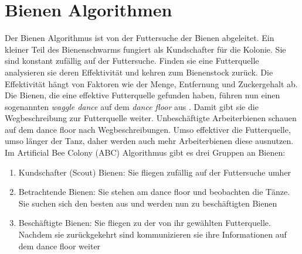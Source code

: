 \section{Bienen Algorithmen}
Der Bienen Algorithmus ist von der Futtersuche der Bienen abgeleitet. Ein kleiner Teil des Bienenschwarms fungiert als Kundschafter für die Kolonie.
Sie sind konstant zufällig auf der Futtersuche. Finden sie eine Futterquelle analysieren sie deren Effektivität und kehren zum Bienenstock zurück. Die Effektivität hängt von Faktoren wie der Menge, Entfernung und Zuckergehalt ab.\cite{PHAM2006454}
Die Bienen, die eine effektive Futterquelle gefunden haben, führen nun einen sogenannten \emph{waggle dance} auf dem \emph{dance floor} aus \cite{Seeley+1995}. Damit gibt sie die Wegbeschreibung zur Futterquelle weiter.
Unbeschäftigte Arbeiterbienen schauen auf dem dance floor nach Wegbeschreibungen. Umso effektiver die Futterquelle, umso länger der Tanz, daher werden auch mehr Arbeiterbienen diese ausnutzen.\cite{KARABOGA2009108}\\

Im Artificial Bee Colony (ABC) Algorithmus gibt es drei Gruppen an Bienen:
\begin{enumerate}
  \item Kundschafter (Scout) Bienen: Sie fliegen zufällig auf der Futtersuche umher
  \item Betrachtende Bienen: Sie stehen am dance floor und beobachten die Tänze. Sie suchen sich den besten aus und werden nun zu beschäftigten Bienen
  \item Beschäftigte Bienen: Sie fliegen zu der von ihr gewählten Futterquelle. Nachdem sie zurückgekehrt sind kommunizieren sie ihre Informationen auf dem dance floor weiter
\end{enumerate} 

